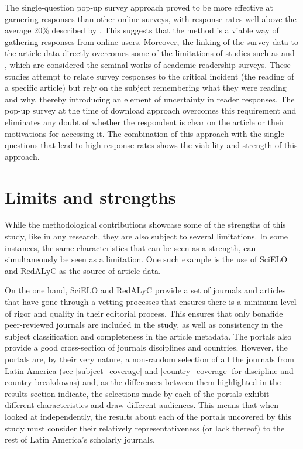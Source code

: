 The single-question pop-up survey approach proved to be more effective at garnering responses than other online surveys, with response rates well above the average 20\% described by  \citet{Couper2001}. This suggests that the method is a viable way of gathering responses from online users. Moreover, the linking of the survey data to the article data directly overcomes some of the limitations of studies such as  \citet{Tenopir2000} and  \citet{Tenopir2010}, which are considered the seminal works of academic readership surveys. These studies attempt to relate survey responses to the critical incident (the reading of a specific article) but rely on the subject remembering what they were reading and why, thereby introducing an element of uncertainty in reader responses. The pop-up survey at the time of download approach overcomes this requirement and eliminates any doubt of whether the respondent is clear on the article or their motivations for accessing it. The combination of this approach with the single-questions that lead to high response rates shows the viability and strength of this approach.

\section{Limits and strengths}
\label{limitsandstrengths}

While the methodological contributions showcase some of the strengths of this study, like in any research, they are also subject to several limitations. In some instances, the same characteristics that can be seen as a strength, can simultaneously be seen as a limitation. One such example is the use of SciELO and RedALyC as the source of article data.

On the one hand, SciELO and RedALyC provide a set of journals and articles that have gone through a vetting processes that ensures there is a minimum level of rigor and quality in their editorial process. This ensures that only bonafide peer-reviewed journals are included in the study, as well as consistency in the subject classification and completeness in the article metadata. The portals also provide a good cross-section of journals disciplines and countries. However, the portals are, by their very nature, a non-random selection of all the journals from Latin America (see \autoref{subject_coverage} and \autoref{country_coverage} for discipline and country breakdowns) and, as the differences between them highlighted in the results section indicate, the selections made by each of the portals exhibit different characteristics and draw different audiences. This means that when looked at independently, the results about each of the portals uncovered by this study must consider their relatively representativeness (or lack thereof) to the rest of Latin America's scholarly journals.

